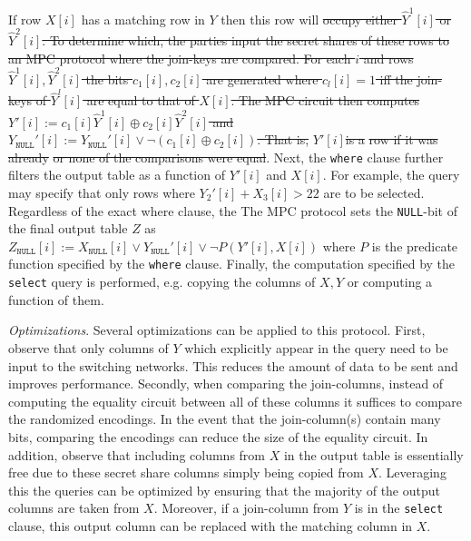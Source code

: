 \documentclass[11pt,letterpaper]{article}
\newcommand{\Null}{\texttt{NULL}\xspace}
\newcommand{\XNull}{\ensuremath{X_\Null}\xspace}
\newcommand{\YNull}{\ensuremath{Y_\Null}\xspace}
\newcommand{\ZNull}{\ensuremath{Z_\Null}\xspace}
\renewcommand{\paragraph}[1]{\vspace{0.1cm}\noindent\emph{#1}.} %
\providecommand{\DIFaddtex}[1]{{\protect\color{blue}\uwave{#1}}} %
\providecommand{\DIFdeltex}[1]{{\protect\color{red}\sout{#1}}}                      %
\providecommand{\DIFaddbegin}{} %
\providecommand{\DIFaddend}{} %
\providecommand{\DIFdelbegin}{} %
\providecommand{\DIFdelend}{} %
\providecommand{\DIFadd}[1]{\texorpdfstring{\DIFaddtex{#1}}{#1}} %
\providecommand{\DIFdel}[1]{\texorpdfstring{\DIFdeltex{#1}}{}} %
\begin{document}
If row $X[i]$ has a matching row in $Y$ then this row will \DIFdelbegin \DIFdel{occupy either ${\widehat{Y}^1}[i]$ or ${\widehat{Y}^2}[i]$. To determine which, the parties input the secret shares of these rows to an MPC protocol where the join-keys are compared. For each $i$ and rows ${\widehat{Y}^1}[i],{\widehat{Y}^2}[i]$ the bits $c_1[i],c_2[i]$ are generated where $c_l[i]=1$ iff the join-keys of ${\widehat{Y}^l}[i]$ are equal to that of $X[i]$. The MPC circuit then computes  $Y'[i]:=c_1[i]{\widehat{Y}^1}[i]\oplus c_2[i]{\widehat{Y}^2}[i]$ and $\YNull'[i]:=\YNull'[i]\vee \neg(c_1[i]\oplus c_2[i])$. That is, }\DIFdelend \DIFaddbegin \DIFadd{have been mapped to }\DIFaddend $Y'[i]$\DIFdelbegin \DIFdel{is a }%
\DIFdel{row if it was already }%
\DIFdel{or none of the comparisons were equal}\DIFdelend . Next, the \texttt{where} clause further filters the output table as a function of $Y'[i]$ and $X[i]$. 
\iffullversion
For example, the query may specify that only rows where $Y_2'[i] + X_3[i] > 22$  are to be selected. Regardless of the exact where clause, the 
\else 
The
\fi
MPC protocol sets the \texttt{NULL}-bit of the final output table $Z$ as $\ZNull[i] :=\XNull[i] \vee \YNull'[i] \vee \neg  P(Y'[i], X[i])$ where $P$ is the predicate function specified by the \texttt{where} clause.
Finally, the computation specified by the \texttt{select} query is performed, e.g. copying the columns of $X,Y$ or computing a function of them. 


\iffullversion
\paragraph{Optimizations\DIFaddbegin \DIFadd{.}\DIFaddend }
Several optimizations can be applied to this protocol. First, observe that only columns of $Y$ which explicitly appear in the query need to be input to the switching networks. This reduces the amount of data to be sent and improves performance. Secondly, when comparing the join-columns, instead of computing the equality circuit between all of these columns it suffices to compare the randomized encodings. In the event that the join-column(s) contain many bits, comparing the encodings can reduce the size of the equality circuit. In addition, observe that including columns from $X$ in the output table is essentially free due to these secret share columns simply being copied from $X$. Leveraging this the queries can be optimized by ensuring that the majority of the output columns are taken from $X$. Moreover, if a join-column from $Y$ is in the \texttt{select} clause, this output column can be replaced with the matching column in $X$.
\end{document}
